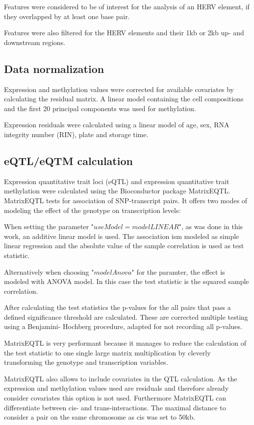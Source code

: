 \documentclass[a4paper,12pt]{article}
\begin{document}
Features were considered to be of interest for the analysis of an HERV element, if they overlapped by at least one base pair.

Features were also filtered for the HERV elements and their 1kb or 2kb up- and downstream regions.

\subsection{Data normalization}
Expression and methylation values were corrected for available covariates by calculating the residual matrix. 
A linear model containing the cell compositions and the first 20 principal components was used for methylation.

Expression residuals were calculated using a linear model of age, sex, RNA integrity number (RIN), plate and storage time. 

\subsection{eQTL/eQTM calculation}
Expression quantitative trait loci (eQTL) and expression quantitative trait methylation were calculated using the Bioconductor package MatrixEQTL\cite{10.1093/bioinformatics/bts163}. MatrixEQTL tests for association of SNP-transcript pairs. It offers two modes of modeling the effect of the genotype on transcription levels: 

When setting the parameter "$useModel = modelLINEAR$", as was done in this work, an additive linear model is used. The association ism modeled as simple linear regression and the absolute value of the sample correlation is used as test statistic.
 
Alternatively when choosing "$modelAnova$" for the paramter, the effect is modeled with ANOVA model. In this case the test statistic is the squared sample correlation.

After calculating the test statistics the p-values for the all pairs that pass a defined significance threshold are calculated. These are corrected multiple testing using a Benjamini- Hochberg procedure, adapted for not recording all p-values.

MatrixEQTL is very performant because it manages to reduce the calculation of the test statistic to one single large matrix multiplication by cleverly transforming the genotype and transcription variables.

MatrixEQTL also allows to include covariates in the QTL calculation. As the expression and methylation values used are residuals and therefore already consider covariates this option is not used. Furthermore MatrixEQTL can differentiate between cis- and trans-interactions. The maximal distance to consider a pair on the same chromosome as cis was set to 50kb. 
\end{document}
